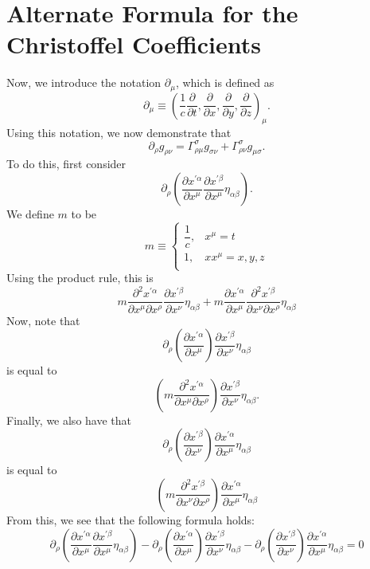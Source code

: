 \documentclass[12pt]{article}
\theoremstyle{definition}
\theoremstyle{remark}
\begin{document}
\section{Alternate Formula for the Christoffel Coefficients}
	Now, we introduce the notation $\partial_{\mu}$, which is defined as 
	\[
	\partial_{\mu} \equiv \left( \frac{1}{c} \frac{ \partial }{  \partial t } , \frac{ \partial }{ \partial x} , \frac{ \partial }{ \partial y }, \frac{ \partial }{ \partial z } \right)_{\mu} .
	\]
	Using this notation, we now demonstrate that 
	\[
	\partial_{\rho} g_{\rho \nu} = \Gamma^{ \sigma }_{ \rho \mu } g_{ \sigma \nu } + \Gamma^{ \sigma }_{ \rho \nu } g_{ \mu \sigma } .
	\]
	To do this, first consider 
	\[
	\partial_{\rho} 
	\left( \frac{ \partial x^{ \prime \alpha } }{ \partial x^{ \mu } } 
	\frac{ \partial x^{ \prime \beta } }{ \partial x^{ \mu } } 
	\eta_{ \alpha \beta } \right).
	\]
	We define $m$ to be 
	\[
	m \equiv 
	\begin{cases} 
	\dfrac{1}{c} ,& x^{\mu} = t \\
	1 ,& xx^{\mu} = x,y,z \\
	\end{cases}
	\]
	Using the product rule, this is
	\[
	m \frac{ \partial^2 x^{ \prime \alpha } }{ \partial x^{ \mu } \partial x^{ \rho } } 
	\frac{ \partial x^{ \prime \beta } }{ \partial x^{ \nu } }
	\eta_{ \alpha \beta }
	+
	m \frac{ \partial x^{ \prime \alpha } }{ \partial x^{ \mu } } 
	\frac{ \partial^2 x^{ \prime \beta } }{ \partial x^{ \nu } \partial x^{ \rho } } \eta_{ \alpha \beta }
	\]
	Now, note that
	\[
	\partial_{ \rho } \left( \frac{ \partial x^{ \prime \alpha } }{ \partial x^{ \mu } } \right)
	\frac{ \partial x^{ \prime \beta } }{ \partial x^{ \nu } } \eta_{\alpha \beta } 
	\]
	is equal to
	\[
	\left( m \frac{ \partial^2 x^{ \prime \alpha } }{ \partial x^{ \mu } \partial x^{ \rho } } \right) \frac{ \partial x^{ \prime \beta } }{ \partial x^{ \nu } } \eta_{ \alpha \beta }.
	\]
	Finally, we also have that
	\[
	\partial_{ \rho } 
	\left( \frac{ \partial x^{ \prime \beta } }{ \partial x^{ \nu } }  \right)
	\frac{ \partial x^{ \prime \alpha } }{ \partial x^{ \mu } } \eta_{ \alpha \beta} 
	\]
	is equal to 
	\[
	\left( m \frac{ \partial^2 x^{ \prime \beta } }{ \partial x^{ \nu } \partial x^{ \rho } } \right) \frac{ \partial x^{ \prime \alpha } }{ \partial x^{ \mu } } \eta_{ \alpha \beta}
	\]
	From this, we see that the following formula holds:
	\[
	\partial_{\rho} 
	\left( \frac{ \partial x^{ \prime \alpha } }{ \partial x^{ \mu } } 
	\frac{ \partial x^{ \prime \beta } }{ \partial x^{ \mu } } 
	\eta_{ \alpha \beta } \right)
	-
	\partial_{ \rho }
	\left( \frac{ \partial x^{ \prime \alpha } }{ \partial x^{ \mu } } \right) 
	\frac{ \partial x^{ \prime \beta } }{ \partial x^{ \nu } } 
	\eta_{ \alpha \beta }
	-
	\partial_{ \rho } 
	\left( \frac{ \partial x^{ \prime \beta } }{ \partial x^{ \nu } } \right) 
	\frac{ \partial x^{ \prime \alpha } }{ \partial x^{ \mu } } \eta_{\alpha \beta } 
	=
	0
	\]
\end{document}
